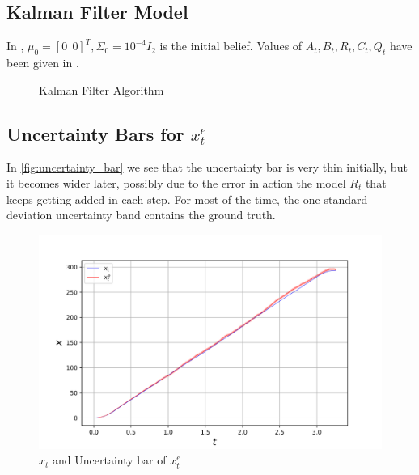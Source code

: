 \subsection{Kalman Filter Model}
In , $\mu_0 = [0 \ \  0]^T, \Sigma_0 = 10^{-4}I_2$ is the initial belief. Values of $A_t, B_t, R_t, C_t, Q_t$ have been given in .
\begin{figure}[h]
    \centering
    \caption{Kalman Filter Algorithm}
    \label{fig:kalman_filter}
\end{figure}

\subsection{Uncertainty Bars for $x^e_t$}
In \autoref{fig:uncertainty_bar} we see that the uncertainty bar is very thin initially, but it becomes wider later, possibly due to the error in action the model $R_t$ that keeps getting added in each step. For most of the time, the one-standard-deviation uncertainty band contains the ground truth.
\begin{figure}[H]
    \centering
    \includegraphics[width=1.0\linewidth]{plots/part1-c.png}
    \caption{$x_t$ and Uncertainty bar of $x_t^e$}
    \label{fig:uncertainty_bar}
\end{figure}

